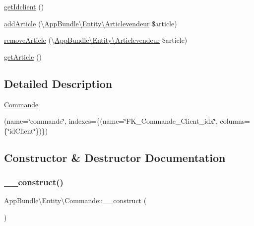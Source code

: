 \begin{DoxyCompactItemize}
\hyperlink{class_app_bundle_1_1_entity_1_1_commande_a53fc877a72f2ef46fb8f73cbd3119572}{get\+Idclient} ()
\item 
\hyperlink{class_app_bundle_1_1_entity_1_1_commande_a9eeb7ff3fd0e9f000dd017e419c9a07b}{add\+Article} (\textbackslash{}\hyperlink{class_app_bundle_1_1_entity_1_1_articlevendeur}{App\+Bundle\textbackslash{}\+Entity\textbackslash{}\+Articlevendeur} \$article)
\item 
\hyperlink{class_app_bundle_1_1_entity_1_1_commande_a5ed9d29d0f703b329e4a8ff13bb51027}{remove\+Article} (\textbackslash{}\hyperlink{class_app_bundle_1_1_entity_1_1_articlevendeur}{App\+Bundle\textbackslash{}\+Entity\textbackslash{}\+Articlevendeur} \$article)
\item 
\hyperlink{class_app_bundle_1_1_entity_1_1_commande_afbcfc733ac7f6689496547c475381df4}{get\+Article} ()
\end{DoxyCompactItemize}


\subsection{Detailed Description}
\hyperlink{class_app_bundle_1_1_entity_1_1_commande}{Commande}

(name=\char`\"{}commande\char`\"{}, indexes=\{(name=\char`\"{}\+F\+K\+\_\+\+Commande\+\_\+\+Client\+\_\+idx\char`\"{}, columns=\{\char`\"{}id\+Client\char`\"{}\})\})  

\subsection{Constructor \& Destructor Documentation}
\mbox{\label{class_app_bundle_1_1_entity_1_1_commande_a3236b821b3f0ef779ad7dc8485ed9fe1}} 
\subsubsection{\texorpdfstring{\+\_\+\+\_\+construct()}{\_\_construct()}}
{\footnotesize\ttfamily App\+Bundle\textbackslash{}\+Entity\textbackslash{}\+Commande\+::\+\_\+\+\_\+construct (\begin{DoxyParamCaption}{ }\end{DoxyParamCaption})}

